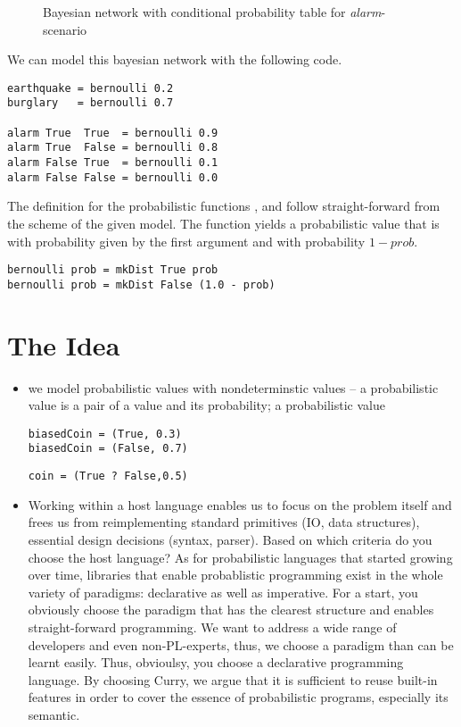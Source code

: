\documentclass[
12pt, %
a4paper, %
oneside, %
]{llncs}
\begin{document}
\begin{figure}
\caption{Bayesian network with conditional probability table for \emph{alarm}-scenario}
\end{figure}

We can model this bayesian network with the following code. %

\begin{verbatim}
earthquake = bernoulli 0.2
burglary   = bernoulli 0.7

alarm True  True  = bernoulli 0.9
alarm True  False = bernoulli 0.8
alarm False True  = bernoulli 0.1
alarm False False = bernoulli 0.0
\end{verbatim}

The definition for the probabilistic functions ,
 and  follow straight-forward from the
scheme of the given model. %
The function  yields a probabilistic value that is
 with probability given by the first argument and
 with probability $1 - prob$. %

\begin{verbatim}
bernoulli prob = mkDist True prob
bernoulli prob = mkDist False (1.0 - prob)
\end{verbatim}

\section{The Idea}

\begin{itemize}
\item we model probabilistic values with nondeterminstic values -- a
  probabilistic value is a pair of a value and its probability; a
  probabilistic value %

\begin{verbatim}
biasedCoin = (True, 0.3)
biasedCoin = (False, 0.7)
\end{verbatim}

\begin{verbatim}
coin = (True ? False,0.5)
\end{verbatim}

\item Working within a host language enables us to focus on the
  problem itself and frees us from reimplementing standard primitives
  (IO, data structures), essential design decisions (syntax,
  parser). %
  Based on which criteria do you choose the host language? %
  As for probabilistic languages that started growing over time,
  libraries that enable probablistic programming exist in the whole
  variety of paradigms: declarative as well as imperative. %
  For a start, you obviously choose the paradigm that has the clearest
  structure and enables straight-forward programming. %
  We want to address a wide range of developers and even
  non-PL-experts, thus, we choose a paradigm than can be learnt
  easily. %
  Thus, obvioulsy, you choose a declarative programming language. %
  By choosing Curry, we argue that it is sufficient to reuse built-in
  features in order to cover the essence of probabilistic programs,
  especially its semantic. %
  
\end{itemize}
\end{document}
